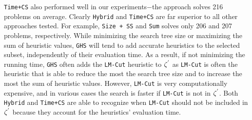 \texttt{Time+CS} also performed well in our experiments$-$the approach solves 216 problems on average. Clearly \texttt{Hybrid} and \texttt{Time+CS} are far superior to all other approaches tested. For example, \texttt{Size + SS} and \texttt{Sum} solves only 206 and 207 problems, respectively. While minimizing the search tree size or maximizing the sum of heuristic values, \texttt{GHS} will tend to add accurate heuristics to the selected subset, independently of their evaluation time. As a result, if not minimizing the running time, \texttt{GHS} often adds the \texttt{LM-Cut} heuristic to $\zeta\sp{'}$ as \texttt{LM-Cut} is often the heuristic that is able to reduce the most the search tree size and to increase the most the sum of heuristic values. However, \texttt{LM-Cut} is very computationally expensive, and in various cases the search is faster if \texttt{LM-Cut} is not in $\zeta\sp{'}$. Both \texttt{Hybrid} and \texttt{Time+CS} are able to recognize when \texttt{LM-Cut} should not be included in $\zeta\sp{'}$ because they account for the heuristics' evaluation time.

